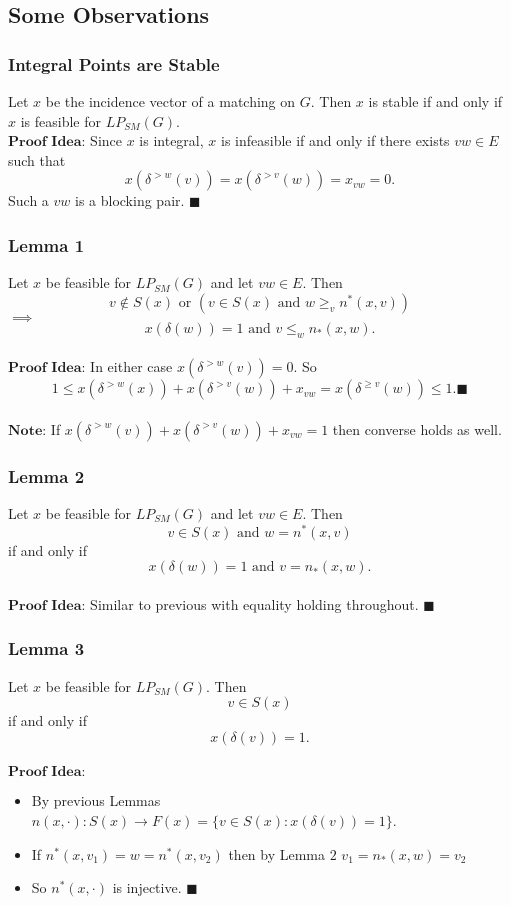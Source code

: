 \documentclass{beamer}
\begin{document}
\subsection{Some Observations}
\begin{frame}
\frametitle{Integral Points are Stable}
Let $x$ be the incidence vector of a matching on $G$. Then $x$ is stable if and only if $x$ is feasible for $LP_{SM}(G)$.\\
$\textbf{Proof Idea:}$ Since $x$ is integral, $x$ is infeasible if and only if there exists $vw \in E$ such that $$ x(\delta^{>w}(v)) = x(\delta^{>v}(w)) = x_{vw} = 0. $$
Such a $vw$ is a blocking pair. $\blacksquare$
\end{frame}

\begin{frame}
\frametitle{Lemma 1}
Let $x$ be feasible for $LP_{SM}(G)$ and let $vw \in E$. Then $$ v \not\in S(x) \text{ or } (v \in S(x) \text{ and } w \geq_v n^*(x,v)) $$ $\implies$ $$ x(\delta(w)) = 1 \text{ and } v \leq_w n_*(x,w). $$\\
$\textbf{Proof Idea:}$ In either case $x(\delta^{>w}(v)) = 0$. So $$1 \leq x(\delta^{>w}(x)) + x(\delta^{>v}(w)) + x_{vw} = x(\delta^{\geq v}(w)) \leq 1. \blacksquare$$\\
$\textbf{Note:}$ If $x(\delta^{>w}(v)) + x(\delta^{>v}(w)) + x_{vw} = 1$ then converse holds as well.
\end{frame}

\begin{frame}
\frametitle{Lemma 2}
Let $x$ be feasible for $LP_{SM}(G)$ and let $vw \in E$. Then $$v \in S(x) \text{ and } w = n^*(x,v)$$ if and only if $$x(\delta(w)) = 1 \text{ and } v = n_*(x,w). $$\\
$\textbf{Proof Idea:}$ Similar to previous with equality holding throughout. $\blacksquare$
\end{frame}

\begin{frame}
\frametitle{Lemma 3}
Let $x$ be feasible for $LP_{SM}(G)$. Then $$ v \in S(x) $$ if and only if $$x(\delta(v)) = 1.$$ \\
$\textbf{Proof Idea:}$
\begin{itemize}
\item By previous Lemmas $n(x,\cdot) : S(x) \rightarrow F(x) = \{v \in S(x) : x(\delta(v)) = 1 \}$.
\item If $n^*(x,v_1) = w = n^*(x,v_2)$ then by Lemma $2$ $v_1 = n_*(x,w) = v_2$
\item So $n^*(x,\cdot)$ is injective. $\blacksquare$
\end{itemize}
\end{frame}
\end{document}
